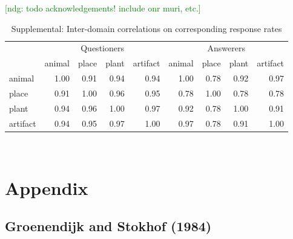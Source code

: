 \documentclass[12pt, floatsintext, jou]{apa6}
\newcommand{\ndg}[1]{\textcolor{Green}{[ndg: #1]}}
\begin{document}
\ndg{todo acknowledgements! include onr muri, etc.}





\begin{table}[t!]
\centering
\begin{tabular}{ p{1.5cm} | r | r | r | r |||||| r | r | r | r |}
& \multicolumn{4}{c||||||}{Questioners} & \multicolumn{4}{c}{Answerers} \\
&             animal &     place &     plant &  artifact &            animal &     place &     plant &  artifact \\
\hline
animal &   1.00 &  0.91 & 0.94 & 0.94 & 1.00 & 0.78 & 0.92 &  0.97 \\
\hline
place &    0.91 &  1.00 & 0.96 & 0.95 & 0.78 & 1.00 &  0.78 & 0.78 \\
\hline
plant &    0.94 & 0.96 & 1.00 & 0.97 & 0.92  & 0.78 &  1.00 & 0.91\\
\hline
artifact & 0.94 & 0.95 & 0.97 & 1.00 & 0.97 & 0.78 &  0.91 & 1.00\\
\end{tabular}
\\[1.5pt]
\caption{Supplemental: Inter-domain correlations on corresponding response rates} 
\label{table:experiment4correlations}
\end{table}

\section{Appendix}

\subsection{Groenendijk and Stokhof (1984)}
\end{document}
